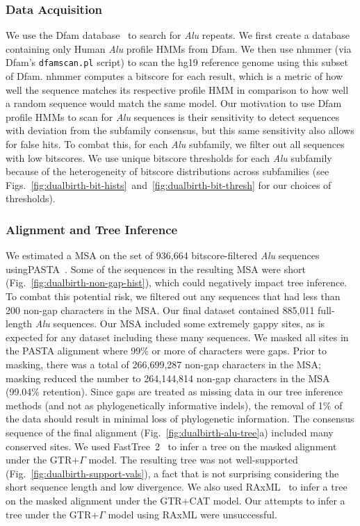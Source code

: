 \subsubsection{Data Acquisition}\label{sec:aluseqs}
We use the Dfam database~\cite{Hubley2016} to search for \textit{Alu} repeats. We first create a database containing only Human \textit{Alu} profile \glspl{HMM} from Dfam. We then use nhmmer (via Dfam's \texttt{dfamscan.pl} script) to scan the hg19 reference genome using this subset of Dfam. nhmmer computes a bitscore for each result, which is a metric of how well the sequence matches its respective profile HMM in comparison to how well a random sequence would match the same model. Our motivation to use Dfam profile \glspl{HMM} to scan for \textit{Alu} sequences is their sensitivity to detect sequences with deviation from the subfamily consensus, but this same sensitivity also allows for false hits. To combat this, for each \textit{Alu} subfamily, we filter out all sequences with low bitscores. We use unique bitscore thresholds for each \textit{Alu} subfamily because of the heterogeneity of bitscore distributions across subfamilies (see Figs.~\ref{fig:dualbirth-bit-hists}~and~\ref{fig:dualbirth-bit-thresh} for our choices of thresholds).

\subsubsection{Alignment and Tree Inference}\label{sec:alutree}
We estimated a \gls{MSA} on the set of 936,664 bitscore-filtered \textit{Alu} sequences using\break PASTA~\cite{Mirarab2015}. Some of the sequences in the resulting MSA were short (Fig.~\ref{fig:dualbirth-non-gap-hist}), which could negatively impact tree inference. To combat this potential risk, we filtered out any sequences that had less than 200 non-gap characters in the \gls{MSA}. Our final dataset contained 885,011 full-length \textit{Alu} sequences. Our \gls{MSA} included some extremely gappy sites, as is expected for any dataset including these many sequences. We masked all sites in the PASTA alignment where 99\% or more of characters were gaps. Prior to masking, there was a total of 266,699,287 non-gap characters in the \gls{MSA}; masking reduced the number to 264,144,814 non-gap characters in the \gls{MSA} (99.04\% retention). Since gaps are treated as missing data in our tree inference methods (and not as phylogenetically informative indels), the removal of 1\% of the data should result in minimal loss of phylogenetic information. The consensus sequence of the final alignment (Fig.~\ref{fig:dualbirth-alu-tree}a) included many conserved sites. We used FastTree~2~\cite{Price2010} to infer a tree on the masked alignment under the \gls{GTR}+$\Gamma$ model. The resulting tree was not well-supported (Fig.~\ref{fig:dualbirth-support-vals}), a fact that is not surprising considering the short sequence length and low divergence. We also used RAxML~\cite{Stamatakis2014} to infer a tree on the masked alignment under the \gls{GTR}+CAT model. Our attempts to infer a tree under the \gls{GTR}+$\Gamma$ model using RAxML were unsuccessful.

